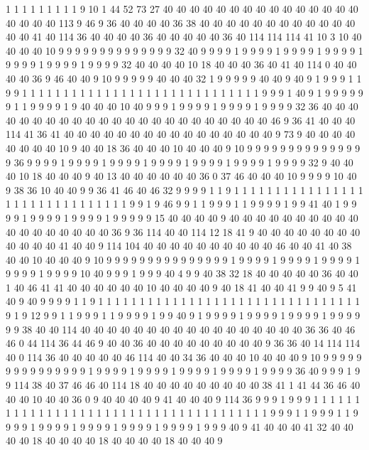 1 1 1 1 1 1 1 1 1 9 10 1 44 52 73 27 40 40 40 40
40 40 40 40 40 40 40 40 40 40 40 40 40 40 40 113 9 46 9 36
40 40 40 40 36 38 40 40 40 40 40 40 40 40 40 40 40 40 40 40
41 40 114 36 40 40 40 40 36 40 40 40 40 40 36 40 114 114 114 41
10 3 10 40 40 40 40 10 9 9 9 9 9 9 9 9 9 9 9 9
9 9 32 40 9 9 9 9 1 9 9 9 9 1 9 9 9 9 1 9
9 9 9 1 9 9 9 9 1 9 9 9 9 1 9 9 9 9 32 40
40 40 40 10 18 40 40 40 36 40 41 40 114 0 40 40 40 40 36 9
46 40 40 9 10 9 9 9 9 9 40 40 40 32 1 9 9 9 9 9
40 40 9 40 9 1 9 9 9 1 1 9 9 1 1 1 1 1 1 1
1 1 1 1 1 1 1 1 1 1 1 1 1 1 1 1 1 1 1 1
1 1 9 9 9 1 40 9 1 9 9 9 9 9 9 1 1 9 9 9
9 1 9 40 40 40 10 40 9 9 9 1 9 9 9 9 1 9 9 9
9 1 9 9 9 9 32 36 40 40 40 40 40 40 40 40 40 40 40 40
40 40 40 40 40 40 40 40 40 40 40 46 9 36 41 40 40 40 114 41
36 41 40 40 40 40 40 40 40 40 40 40 40 40 40 40 40 40 9 73
9 40 40 40 40 40 40 40 40 10 9 40 40 18 36 40 40 40 10 40
40 40 9 10 9 9 9 9 9 9 9 9 9 9 9 9 9 9 9 36
9 9 9 9 1 9 9 9 9 1 9 9 9 9 1 9 9 9 9 1
9 9 9 9 1 9 9 9 9 1 9 9 9 9 32 9 40 40 40 10
18 40 40 40 9 40 13 40 40 40 40 40 40 36 0 37 46 40 40 40
10 9 9 9 9 10 40 9 38 36 10 40 40 9 9 36 41 46 40 46
32 9 9 9 9 1 1 9 1 1 1 1 1 1 1 1 1 1 1 1
1 1 1 1 1 1 1 1 1 1 1 1 1 1 1 1 1 1 1 9
9 1 9 46 9 9 1 1 9 9 9 1 1 9 9 9 9 1 9 9
41 40 1 9 9 9 9 1 9 9 9 9 1 9 9 9 9 1 9 9
9 9 9 15 40 40 40 40 9 40 40 40 40 40 40 40 40 40 40 40
40 40 40 40 40 40 40 36 9 36 114 40 40 114 12 18 41 9 40 40
40 40 40 40 40 40 40 40 40 40 41 40 40 9 114 104 40 40 40 40
40 40 40 40 40 40 46 40 40 41 40 38 40 40 10 40 40 40 9 10
9 9 9 9 9 9 9 9 9 9 9 9 9 9 9 1 9 9 9 9
1 9 9 9 9 1 9 9 9 9 1 9 9 9 9 1 9 9 9 9
10 40 9 9 9 1 9 9 9 40 4 9 9 40 38 32 18 40 40 40
40 40 36 40 40 1 40 46 41 41 40 40 40 40 40 40 10 40 40 40
40 9 40 18 41 40 40 41 9 9 40 9 5 41 40 9 40 9 9 9
9 1 1 9 1 1 1 1 1 1 1 1 1 1 1 1 1 1 1 1
1 1 1 1 1 1 1 1 1 1 1 1 1 1 1 1 9 1 9 12
9 9 1 1 9 9 9 1 1 9 9 9 9 1 9 9 40 9 1 9
9 9 9 1 9 9 9 9 1 9 9 9 9 1 9 9 9 9 9 9
38 40 40 114 40 40 40 40 40 40 40 40 40 40 40 40 40 40 40 40
40 36 36 40 46 46 0 44 114 36 44 46 9 40 40 36 40 40 40 40
40 40 40 40 40 9 36 36 40 14 114 114 40 0 114 36 40 40 40 40
40 46 114 40 40 34 36 40 40 40 10 40 40 40 9 10 9 9 9 9
9 9 9 9 9 9 9 9 9 9 9 1 9 9 9 9 1 9 9 9
9 1 9 9 9 9 1 9 9 9 9 1 9 9 9 9 36 40 9 9
9 1 9 9 114 38 40 37 46 46 40 114 18 40 40 40 40 40 40 40
40 40 38 41 1 41 44 36 46 40 40 40 10 40 40 36 0 9 40 40
40 40 9 41 40 40 40 9 114 36 9 9 9 1 9 9 9 1 1 1
1 1 1 1 1 1 1 1 1 1 1 1 1 1 1 1 1 1 1 1
1 1 1 1 1 1 1 1 1 1 1 1 1 1 1 9 9 9 1 1
9 9 9 1 1 9 9 9 9 1 9 9 9 9 1 9 9 9 9 1
9 9 9 9 1 9 9 9 9 1 9 9 9 40 9 41 40 40 40 41
32 40 40 40 40 18 40 40 40 40 18 40 40 40 40 18 40 40 40 9

